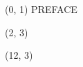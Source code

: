 \documentclass[10pt]{article}
\begin{document}
\begin{textblock}{23} (0, 1)
\center\huge PREFACE
\end{textblock}

\begin{textblock}{9} (2, 3)
    {}
\end{textblock}

\begin{textblock}{9} (12, 3)
    {}
\end{textblock}
\end{document}
